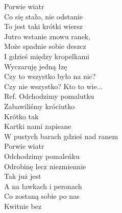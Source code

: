 \begin{flushleft}
\hspace{0.9cm}Porwie wiatr \\
\vskip 3mm
Co się stało, nie odstanie \\
To jest taki krótki wiersz \\
Jutro wstanie znowu ranek, \\
Może spadnie sobie deszcz \\
I gdzieś między kropelkami \\
Wyczaruję jedną łzę \\
\newpage
Czy to wszystko było na nic? \\
Czy nie wszystko? Kto to wie... \\
\vskip 3mm
Ref. Odchodzimy pomalutku\\
\hspace{0.9cm}Zabawiliśmy króciutko  \\
\hspace{0.9cm}Krótko tak \\
\hspace{0.9cm}Kartki nami zapisane \\
\hspace{0.9cm}W pustych barach gdzieś nad ranem \\
\hspace{0.9cm}Porwie wiatr \\
\vskip 3mm
\hspace{0.9cm}Odchodzimy pomaleńku \\
\hspace{0.9cm}Odrobinę lecz niezmiennie \\
\hspace{0.9cm}Tak już jest \\
\hspace{0.9cm}A na ławkach i peronach \\
\hspace{0.9cm}Co zostaną sobie po nas \\
\hspace{0.9cm}Kwitnie bez \\
\end{flushleft}
\clearpage
